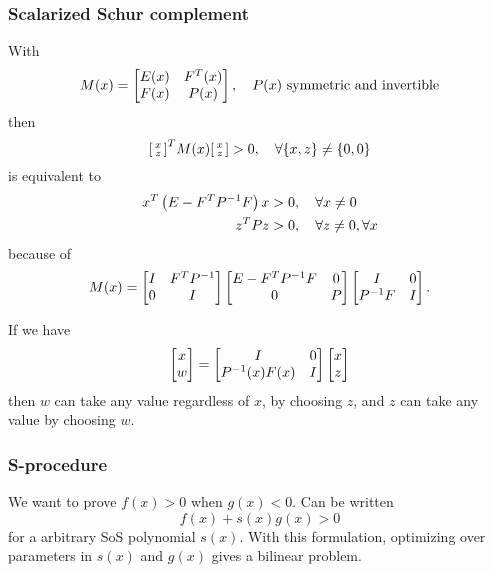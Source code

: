 \subsubsection{Scalarized Schur complement}
With
%
\begin{equation}
  M(x) = \begin{bmatrix} E(x) & F^{T}(x) \\ F(x) & P(x) \end{bmatrix},\quad P(x) \mbox{ symmetric and invertible}
\end{equation}
%
then
%
\begin{equation}
  \begin{bsmallmatrix} x \\ z \end{bsmallmatrix}^{T} M(x) \begin{bsmallmatrix} x \\ z \end{bsmallmatrix} > 0,\quad \forall\{x,z\} \neq \{0,0\}
\end{equation}
%
is equivalent to
%
\begin{equation}
  \begin{split}
    x^{T} \left( E - F^{T} P^{-1} F \right) x &> 0,\quad \forall x \neq 0 \\
    z^{T} P z &> 0,\quad \forall z \neq 0, \forall x
  \end{split}
\end{equation}
%
because of
%
\begin{equation}
  M(x) =
  \begin{bmatrix} I & F^{T} P^{-1} \\ 0 & I \end{bmatrix}
  \begin{bmatrix} E - F^{T} P^{-1} F & 0 \\ 0 & P \end{bmatrix}
  \begin{bmatrix} I & 0 \\ P^{-1} F & I \end{bmatrix}.
\end{equation}

If we have
%
\begin{equation}
  \begin{bmatrix} x \\ w \end{bmatrix} =
  \begin{bmatrix} I & 0 \\ P^{-1}(x) F(x) & I \end{bmatrix}
  \begin{bmatrix} x \\ z \end{bmatrix}
\end{equation}
%
then $w$ can take any value regardless of $x$, by choosing $z$, and $z$ can take any value by choosing $w$.

\subsubsection{S-procedure}
We want to prove $f(x) > 0$ when $g(x) < 0$. Can be written
%
\begin{equation}
  f(x) + s(x) g(x) > 0
\end{equation}
%
for a arbitrary SoS polynomial $s(x)$. With this formulation, optimizing over parameters in $s(x)$ and $g(x)$ gives a bilinear problem.

